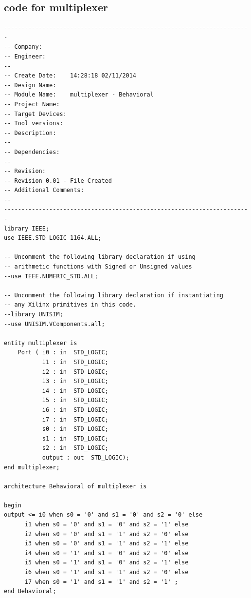 \documentclass[12pt]{article}
\begin{document}
\subsection{code for multiplexer}
\begin{lstlisting}[style=vhdl]
-----------------------------------------------------------------------
-- Company: 
-- Engineer: 
-- 
-- Create Date:    14:28:18 02/11/2014 
-- Design Name: 
-- Module Name:    multiplexer - Behavioral 
-- Project Name: 
-- Target Devices: 
-- Tool versions: 
-- Description: 
--
-- Dependencies: 
--
-- Revision: 
-- Revision 0.01 - File Created
-- Additional Comments: 
--
-----------------------------------------------------------------------
library IEEE;
use IEEE.STD_LOGIC_1164.ALL;

-- Uncomment the following library declaration if using
-- arithmetic functions with Signed or Unsigned values
--use IEEE.NUMERIC_STD.ALL;

-- Uncomment the following library declaration if instantiating
-- any Xilinx primitives in this code.
--library UNISIM;
--use UNISIM.VComponents.all;

entity multiplexer is
    Port ( i0 : in  STD_LOGIC;
           i1 : in  STD_LOGIC;
           i2 : in  STD_LOGIC;
           i3 : in  STD_LOGIC;
           i4 : in  STD_LOGIC;
           i5 : in  STD_LOGIC;
           i6 : in  STD_LOGIC;
           i7 : in  STD_LOGIC;
           s0 : in  STD_LOGIC;
           s1 : in  STD_LOGIC;
           s2 : in  STD_LOGIC;
           output : out  STD_LOGIC);
end multiplexer;

architecture Behavioral of multiplexer is

begin
output <= i0 when s0 = '0' and s1 = '0' and s2 = '0' else 
	  i1 when s0 = '0' and s1 = '0' and s2 = '1' else 
	  i2 when s0 = '0' and s1 = '1' and s2 = '0' else  
	  i3 when s0 = '0' and s1 = '1' and s2 = '1' else
	  i4 when s0 = '1' and s1 = '0' and s2 = '0' else
	  i5 when s0 = '1' and s1 = '0' and s2 = '1' else
	  i6 when s0 = '1' and s1 = '1' and s2 = '0' else
	  i7 when s0 = '1' and s1 = '1' and s2 = '1' ;
end Behavioral;


\end{lstlisting}
\newpage
\end{document}
